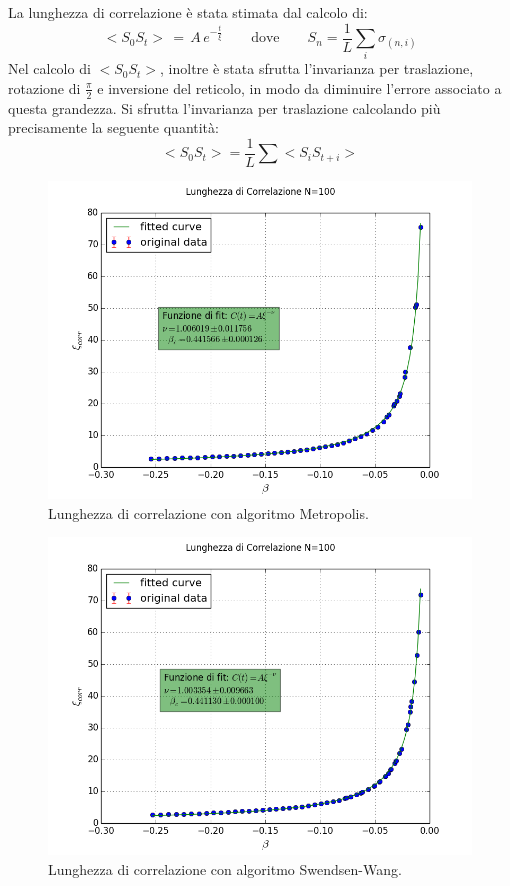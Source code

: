 La lunghezza di correlazione è stata stimata dal calcolo di:
$$
	<S_0 S_t > \, = \, A \, e^{-\frac{t}{\xi}} \qquad \mbox{dove} \qquad S_n = \frac{1}{L} \sum_i \sigma_{(n,i)} 
$$
Nel calcolo di $<S_0 S_t>$, inoltre è stata sfrutta l'invarianza per traslazione, rotazione di $\frac{\pi}{2}$ e inversione del reticolo, in modo da diminuire l'errore associato a questa grandezza.
Si sfrutta l'invarianza per traslazione calcolando più precisamente la seguente quantità:
$$
	<S_0 S_t> = \frac{1}{L} \sum <S_i S_{t+i}>
$$ 
\begin{figure}[h]
\centering
	\includegraphics[scale=0.56]{metropolis/corrN100.png}
\caption{Lunghezza di correlazione con algoritmo Metropolis.}
\end{figure}
\begin{figure}[h]
\centering
	\includegraphics[scale=0.56]{sw/corrN100.png}
\caption{Lunghezza di correlazione con algoritmo Swendsen-Wang.}
\end{figure}
